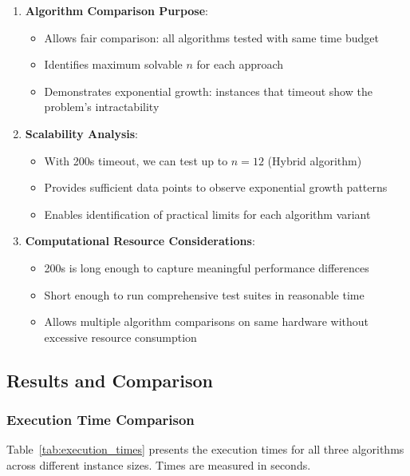 \documentclass[12pt]{article}
\begin{document}
\begin{enumerate}
    \item \textbf{Algorithm Comparison Purpose}:
    \begin{itemize}
        \item Allows fair comparison: all algorithms tested with same time budget
        \item Identifies maximum solvable $n$ for each approach
        \item Demonstrates exponential growth: instances that timeout show the problem's intractability
    \end{itemize}
    
    \item \textbf{Scalability Analysis}:
    \begin{itemize}
        \item With 200s timeout, we can test up to $n=12$ (Hybrid algorithm)
        \item Provides sufficient data points to observe exponential growth patterns
        \item Enables identification of practical limits for each algorithm variant
    \end{itemize}
    
    \item \textbf{Computational Resource Considerations}:
    \begin{itemize}
        \item 200s is long enough to capture meaningful performance differences
        \item Short enough to run comprehensive test suites in reasonable time
        \item Allows multiple algorithm comparisons on same hardware without excessive resource consumption
    \end{itemize}
\end{enumerate}

\subsection{Results and Comparison}
\label{subsec:results}

\subsubsection{Execution Time Comparison}

Table~\ref{tab:execution_times} presents the execution times for all three algorithms across different instance sizes. Times are measured in seconds.
\end{document}
